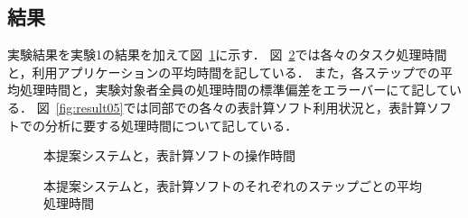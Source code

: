\documentclass[sotsuron]{kuee}
\begin{document}
		\subsection{結果}
			実験結果を実験1の結果を加えて図~\ref{fig:result03}に示す．
			図~\ref{fig:result04}では各々のタスク処理時間と，利用アプリケーションの平均時間を記している．
			また，各ステップでの平均処理時間と，実験対象者全員の処理時間の標準偏差をエラーバーにて記している．
			図~\ref{fig:result05}では同部での各々の表計算ソフト利用状況と，表計算ソフトでの分析に要する処理時間について記している．
			\begin{figure}
				\begin{center}
				\end{center}
				\caption{本提案システムと，表計算ソフトの操作時間}
		  		\label{fig:result03}
			\end{figure}
			\begin{figure}
				\begin{center}
				\end{center}
				\caption{本提案システムと，表計算ソフトのそれぞれのステップごとの平均処理時間}
		  		\label{fig:result04}
			\end{figure}
\end{document}
